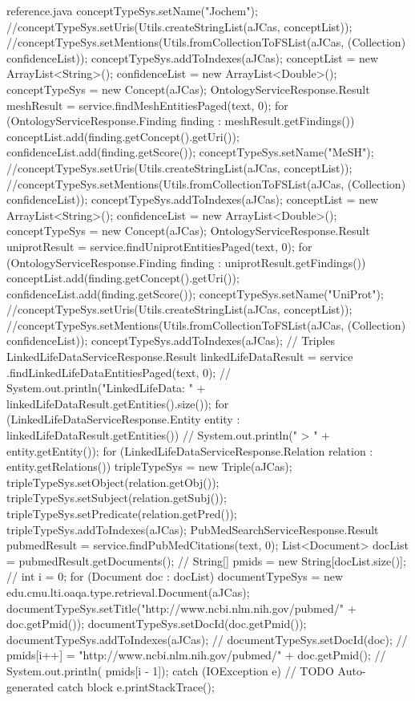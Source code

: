 \begin{chunk}{reference.java}
{{{{      }
      conceptTypeSys.setName("Jochem");
      //conceptTypeSys.setUris(Utils.createStringList(aJCas, conceptList));
      //conceptTypeSys.setMentions(Utils.fromCollectionToFSList(aJCas, (Collection) confidenceList));
      conceptTypeSys.addToIndexes(aJCas);
      conceptList = new ArrayList<String>();
      confidenceList = new ArrayList<Double>();
      conceptTypeSys = new Concept(aJCas);
      OntologyServiceResponse.Result meshResult = service.findMeshEntitiesPaged(text, 0);
      for (OntologyServiceResponse.Finding finding : meshResult.getFindings()) {
        conceptList.add(finding.getConcept().getUri());
        confidenceList.add(finding.getScore());
      }
      conceptTypeSys.setName("MeSH");
      //conceptTypeSys.setUris(Utils.createStringList(aJCas, conceptList));
      //conceptTypeSys.setMentions(Utils.fromCollectionToFSList(aJCas, (Collection) confidenceList));
      conceptTypeSys.addToIndexes(aJCas);
      conceptList = new ArrayList<String>();
      confidenceList = new ArrayList<Double>();
      conceptTypeSys = new Concept(aJCas);
      OntologyServiceResponse.Result uniprotResult = service.findUniprotEntitiesPaged(text, 0);
      for (OntologyServiceResponse.Finding finding : uniprotResult.getFindings()) {
        conceptList.add(finding.getConcept().getUri());
        confidenceList.add(finding.getScore());
      }
      conceptTypeSys.setName("UniProt");
      //conceptTypeSys.setUris(Utils.createStringList(aJCas, conceptList));
      //conceptTypeSys.setMentions(Utils.fromCollectionToFSList(aJCas, (Collection) confidenceList));
      conceptTypeSys.addToIndexes(aJCas);
      // Triples
      LinkedLifeDataServiceResponse.Result linkedLifeDataResult = service
              .findLinkedLifeDataEntitiesPaged(text, 0);
      // System.out.println("LinkedLifeData: " + linkedLifeDataResult.getEntities().size());
      for (LinkedLifeDataServiceResponse.Entity entity : linkedLifeDataResult.getEntities()) {
        // System.out.println(" > " + entity.getEntity());
        for (LinkedLifeDataServiceResponse.Relation relation : entity.getRelations()) {
          tripleTypeSys = new Triple(aJCas);
          tripleTypeSys.setObject(relation.getObj());
          tripleTypeSys.setSubject(relation.getSubj());
          tripleTypeSys.setPredicate(relation.getPred());
          tripleTypeSys.addToIndexes(aJCas);
        }
      }
      PubMedSearchServiceResponse.Result pubmedResult = service.findPubMedCitations(text, 0);
      List<Document> docList = pubmedResult.getDocuments();
      // String[] pmids = new String[docList.size()];
      // int i = 0;
      for (Document doc : docList) {
        documentTypeSys = new edu.cmu.lti.oaqa.type.retrieval.Document(aJCas);
        documentTypeSys.setTitle("http://www.ncbi.nlm.nih.gov/pubmed/" + doc.getPmid());
        documentTypeSys.setDocId(doc.getPmid());
        documentTypeSys.addToIndexes(aJCas);
        // documentTypeSys.setDocId(doc);
        // pmids[i++] = "http://www.ncbi.nlm.nih.gov/pubmed/" + doc.getPmid();
        // System.out.println( pmids[i - 1]);
      }
    } catch (IOException e) {
      // TODO Auto-generated catch block
      e.printStackTrace();
    }
  }
}
\end{chunk}

